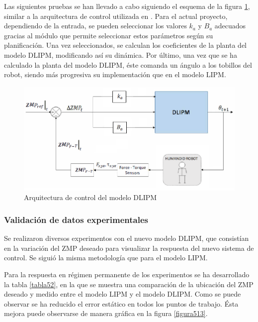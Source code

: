 Las siguientes pruebas se han llevado a cabo siguiendo el esquema de la figura \ref{figura512}, similar a la arquitectura de control utilizada en \cite{ref21}. Para el actual proyecto, dependiendo de la entrada, se pueden seleccionar los valores $k_a$ y $B_a$ adecuados gracias al módulo que permite seleccionar estos parámetros según su planificación. Una vez seleccionados, se calculan los coeficientes de la planta del modelo DLIPM, modificando así su dinámica. Por último, una vez que se ha calculado la planta del modelo DLIPM, éste comanda un ángulo a los tobillos del robot, siendo más progresiva su implementación que en el modelo LIPM.

\begin{figure}[H]
\centering
\includegraphics[scale=0.55]{imagenes/apartado_5/510_esquema_DLIPM}
\caption{Arquitectura de control del modelo DLIPM}
\label{figura512}
\end{figure}

\subsubsection{Validación de datos experimentales}

Se realizaron diversos experimentos con el nuevo modelo DLIPM, que consistían en la variación del ZMP deseado para visualizar la respuesta del nuevo sistema de control. Se siguió la misma metodología que para el modelo LIPM.

Para la respuesta en régimen permanente de los experimentos se ha desarrollado la tabla \ref{tabla52}, en la que se muestra una comparación de la ubicación del ZMP deseado y medido entre el modelo LIPM y el modelo DLIPM. Como se puede observar se ha reducido el error estático en todos los puntos de trabajo. Ésta mejora puede observarse de manera gráfica en la figura \ref{figura513}.

